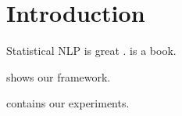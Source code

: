 \section{Introduction}

Statistical NLP is great \citep{manning99nlp}.
\citet{manning99nlp} is a book.

 shows our framework.

 contains our experiments.

